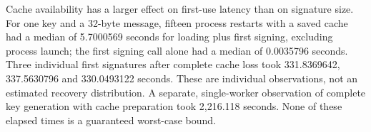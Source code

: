 Cache availability has a larger effect on first-use latency than on signature size. For one key and a 32-byte message, fifteen process restarts with a saved cache had a median of 5.7000569 seconds for loading plus first signing, excluding process launch; the first signing call alone had a median of 0.0035796 seconds. Three individual first signatures after complete cache loss took 331.8369642, 337.5630796 and 330.0493122 seconds. These are individual observations, not an estimated recovery distribution. A separate, single-worker observation of complete key generation with cache preparation took 2,216.118 seconds. None of these elapsed times is a guaranteed worst-case bound.


